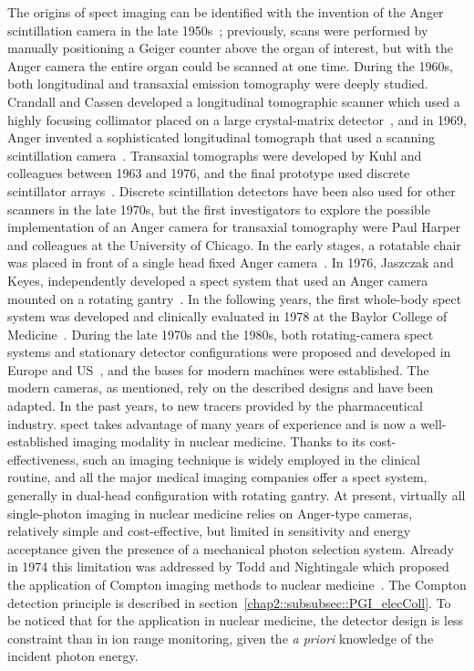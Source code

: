 The origins of \gls{spect} imaging can be identified with the invention of the Anger scintillation camera in the late 1950s~\parencite{Anger1958, Anger1964}; previously, scans were performed by manually positioning a Geiger counter above the organ of interest, but with the Anger camera the entire organ could be scanned at one time. During the 1960s, both longitudinal and transaxial emission tomography were deeply studied. Crandall and Cassen developed a longitudinal tomographic scanner which used a highly focusing collimator placed on a large crystal-matrix detector~\parencite{Crandall1966}, and in 1969, Anger invented a sophisticated longitudinal tomograph that used a scanning scintillation camera~\parencite{Anger1969}. Transaxial tomographs were developed by Kuhl and colleagues between 1963 and 1976, and the final prototype used discrete scintillator arrays~\parencite{Kuhl1976}. Discrete scintillation detectors have been also used for other scanners in the late 1970s, but the first investigators to explore the possible implementation of an Anger camera for transaxial tomography were Paul Harper and colleagues at the University of Chicago. In the early stages, a rotatable chair was placed in front of a single head fixed Anger camera~\parencite{Muehllehner1971}. In 1976, Jaszczak and Keyes, independently developed a \gls{spect} system that used an Anger camera mounted on a rotating gantry~\parencite{Jaszczak1977, Keyes1977}. In the following years, the first whole-body \gls{spect} system was developed and clinically evaluated in 1978 at the Baylor College of Medicine~\parencite{Jaszczak1979}. During the late 1970s and the 1980s, both rotating-camera \gls{spect} systems and stationary detector configurations were proposed and developed in Europe and US~\parencite{Larsson1980, Rogers1988}, and the bases for modern machines were established. 
The modern cameras, as mentioned, rely on the described designs and have been adapted. In the past years, to new tracers provided by the pharmaceutical industry. \gls{spect} takes advantage of many years of experience and is now a well-established imaging modality in nuclear medicine. Thanks to its cost-effectiveness, such an imaging technique is widely employed in the clinical routine, and all the major medical imaging companies offer a \gls{spect} system, generally in dual-head configuration with rotating gantry.
At present, virtually all single-photon imaging in nuclear medicine relies on Anger-type cameras, relatively simple and cost-effective, but limited in sensitivity and energy acceptance given the presence of a mechanical photon selection system. Already in 1974 this limitation was addressed by Todd and Nightingale which proposed the application of Compton imaging methods to nuclear medicine~\parencite{Todd1974}. The Compton detection principle is described in section~\ref{chap2::subsubsec::PGI_elecColl}. To be noticed that for the application in nuclear medicine, the detector design is less constraint than in ion range monitoring, given the \textit{a priori} knowledge of the incident photon energy.
